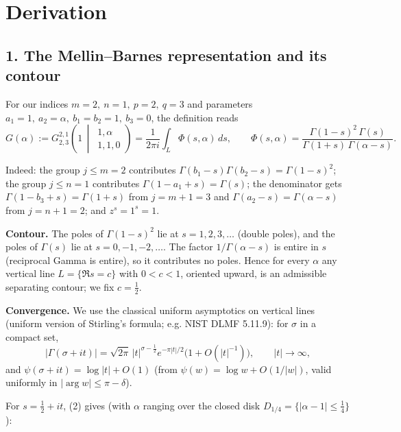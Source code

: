 \documentclass[11pt]{article}
\theoremstyle{remark}
\begin{document}
\section*{Derivation}

\subsection*{1. The Mellin--Barnes representation and its contour}

For our indices $m=2,\ n=1,\ p=2,\ q=3$ and parameters $a_1=1,\ a_2=\alpha,\ b_1=b_2=1,\ b_3=0$, the definition reads
\begin{equation*}
G(\alpha):=G_{2,3}^{2,1}\!\left(1\,\middle|\,\begin{array}{c}1,\alpha\\1,1,0\end{array}\right)
=\frac{1}{2\pi i}\int_{L}\Phi(s,\alpha)\,ds,
\qquad
\Phi(s,\alpha)=\frac{\Gamma(1-s)^2\,\Gamma(s)}{\Gamma(1+s)\,\Gamma(\alpha-s)} . \tag{1}
\end{equation*}

Indeed: the group $j\le m=2$ contributes $\Gamma(b_1-s)\Gamma(b_2-s)=\Gamma(1-s)^2$; the group $j\le n=1$ contributes $\Gamma(1-a_1+s)=\Gamma(s)$; the denominator gets $\Gamma(1-b_3+s)=\Gamma(1+s)$ from $j=m+1=3$ and $\Gamma(a_2-s)=\Gamma(\alpha-s)$ from $j=n+1=2$; and $z^s=1^s=1$.

\textbf{Contour.} The poles of $\Gamma(1-s)^2$ lie at $s=1,2,3,\dots$ (double poles), and the poles of $\Gamma(s)$ lie at $s=0,-1,-2,\dots$. The factor $1/\Gamma(\alpha-s)$ is entire in $s$ (reciprocal Gamma is entire), so it contributes no poles. Hence for every $\alpha$ any vertical line $L=\{\Re s=c\}$ with $0<c<1$, oriented upward, is an admissible separating contour; we fix $c=\tfrac12$.

\textbf{Convergence.} We use the classical uniform asymptotics on vertical lines (uniform version of Stirling's formula; e.g. NIST DLMF 5.11.9): for $\sigma$ in a compact set,
\begin{equation*}
|\Gamma(\sigma+it)|=\sqrt{2\pi}\,|t|^{\sigma-\frac12}e^{-\pi|t|/2}\bigl(1+O(|t|^{-1})\bigr),\qquad |t|\to\infty, \tag{2}
\end{equation*}
and $\psi(\sigma+it)=\log|t|+O(1)$ (from $\psi(w)=\log w+O(1/|w|)$, valid uniformly in $|\arg w|\le\pi-\delta$).

For $s=\tfrac12+it$, (2) gives (with $\alpha$ ranging over the closed disk $D_{1/4}=\{|\alpha-1|\le\frac14\}$):
\end{document}
